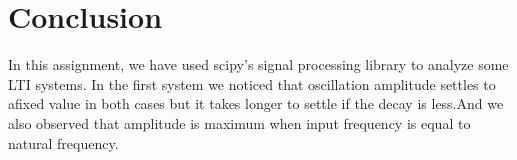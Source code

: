 \documentclass{article}
\begin{document}
\section*{Conclusion}
In this assignment, we have used scipy's signal processing library to analyze some LTI systems. In the first system we noticed that oscillation amplitude settles to afixed value in both cases but it takes longer to settle if the decay is less.And we also observed that amplitude is maximum when input frequency is equal to natural frequency.
\end{document}
